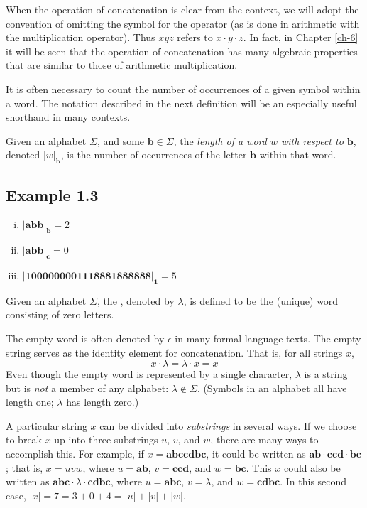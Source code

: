 When the operation of concatenation is clear from the context, we will adopt the 
convention of omitting the symbol for the operator (as is done in arithmetic
with the multiplication operator). Thus $xyz$ refers to $x \cdot y \cdot z$. In
fact, in Chapter \ref{ch-6} it will be seen that the operation of concatenation
has many algebraic properties that are similar to those of arithmetic
multiplication.

It is often necessary to count the number of occurrences of a given symbol
within a word. The notation described in the next definition will be an
especially useful shorthand in many contexts.

\begin{dfn}\label{dfn-1.6}
Given an alphabet $\Sigma$, and some $\pmb{b} \in \Sigma$, the \emph{length of a word
$w$ with respect to $\pmb{b}$}, denoted $|w|_{\pmb{b}}$, is the number of
occurrences of the letter $\pmb{b}$ within that word.
\end{dfn}

\subsection*{Example 1.3}
\begin{enumerate}[i.]
\item $|\pmb{abb}|_{\pmb{b}}=2$
\item $|\pmb{abb}|_{\pmb{c}}=0$
\item $|\pmb{1000000001118881888888}|_{\pmb{1}}=5$
\end{enumerate}

\begin{dfn}\label{dfn-1.7}
Given an alphabet $\Sigma$, the \emph{}, denoted by $\lambda$, is
defined to be the (unique) word consisting of zero letters.
\end{dfn}

The empty word is often denoted by $\epsilon$ in many formal language texts. The
empty string serves as the identity element for concatenation. That is, for all
strings $x$,
\[ x \cdot \lambda = \lambda \cdot x = x \]
Even though the empty word is represented by a single character,
$\lambda$ is a string but is \emph{not} a member of any alphabet:
$\lambda \not \in \Sigma$.
(Symbols in an alphabet all have length one; $\lambda$ has length zero.)

A particular string $x$ can be divided into \emph{substrings} in several ways.
If we choose to break $x$ up into three substrings $u$, $v$, and $w$, there are
many ways to accomplish this. For example, if $x=\pmb{abccdbc}$, it could be
written as $\pmb{ab}\cdot\pmb{ccd}\cdot\pmb{bc}$; that is, $x=uvw$, where $u=
\pmb{ab}$, $v=\pmb{ccd}$, and $w=\pmb{bc}$. This $x$ could also be written as
$\pmb{abc}\cdot\lambda\cdot\pmb{cdbc}$, where $u=\pmb{abc}$, $v=\lambda$, and
$w=\pmb{cdbc}$. In this second case, $|x|=7=3+0+4=|u|+|v|+|w|$.

